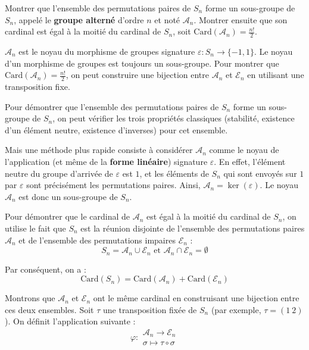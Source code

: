 \documentclass[11pt, a4paper]{article}
\theoremstyle{definition}
\begin{document}
\clearpage

\begin{tcolorbox}[instructionstyle]
	Montrer que l'ensemble des permutations paires de $S_n$ forme un sous-groupe de $S_n$, appelé le \textbf{groupe alterné} d'ordre $n$ et noté $\mathcal{A}_n$. Montrer ensuite que son cardinal est égal à la moitié du cardinal de $S_n$, soit $\mathrm{Card}(\mathcal{A}_n) = \frac{n!}{2}$.
\end{tcolorbox}

\begin{tcolorbox}[methodstyle]
	$\mathcal{A}_n$ est le noyau du morphisme de groupes signature $\varepsilon : S_n \to \{-1, 1\}$. Le noyau d'un morphisme de groupes est toujours un sous-groupe. Pour montrer que $\mathrm{Card}(\mathcal{A}_n) = \frac{n!}{2}$, on peut construire une bijection entre $\mathcal{A}_n$ et $\mathcal{E}_n$ en utilisant une transposition fixe.
\end{tcolorbox}

Pour démontrer que l'ensemble des permutations paires de $S_n$ forme un sous-groupe de $S_n$, on peut vérifier les trois propriétés classiques (stabilité, existence d'un élément neutre, existence d'inverses) pour cet ensemble.
    
Mais une méthode plus rapide consiste à considérer $\mathcal{A}_n$ comme le noyau de l'application (et même de la \textbf{forme linéaire}) signature $\varepsilon$. En effet, l'élément neutre du groupe d'arrivée de $\varepsilon$ est $1$, et les éléments de $S_n$ qui sont envoyés sur $1$ par $\varepsilon$ sont précisément les permutations paires. Ainsi, $\mathcal{A}_n = \ker(\varepsilon)$. Le noyau $\mathcal{A}_n$ est donc un sous-groupe de $S_n$.

Pour démontrer que le cardinal de $\mathcal{A}_n$ est égal à la moitié du cardinal de $S_n$, on utilise le fait que $S_n$ est la réunion disjointe de l'ensemble des permutations paires $\mathcal{A}_n$ et de l'ensemble des permutations impaires $\mathcal{E}_n$ :
$$S_n = \mathcal{A}_n \cup \mathcal{E}_n \text{ et } \mathcal{A}_n \cap \mathcal{E}_n = \emptyset$$

Par conséquent, on a :
$$\mathrm{Card}(S_n) = \mathrm{Card}(\mathcal{A}_n) + \mathrm{Card}(\mathcal{E}_n)$$

Montrons que $\mathcal{A}_n$ et $\mathcal{E}_n$ ont le même cardinal en construisant une bijection entre ces deux ensembles. Soit $\tau$ une transposition fixée de $S_n$ (par exemple, $\tau = (1 \ 2)$). On définit l'application suivante :
$$\varphi : \begin{matrix} \mathcal{A}_n \to \mathcal{E}_n \\ \sigma \mapsto \tau \circ \sigma \end{matrix}$$
\end{document}
